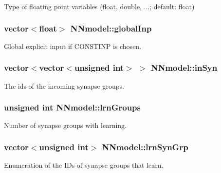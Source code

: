 Type of floating point variables (float, double, ...; default\+: float) 

\hypertarget{classNNmodel_a8df5fd36faa5a56edea7d287fea1f625}{
\subsubsection[{global\+Inp}]{\setlength{\rightskip}{0pt plus 5cm}vector$<$float$>$ N\+Nmodel\+::global\+Inp}}\label{classNNmodel_a8df5fd36faa5a56edea7d287fea1f625}


Global explicit input if C\+O\+N\+S\+T\+I\+N\+P is chosen. 

\hypertarget{classNNmodel_af3f5459e9438989b12e4b675352dd258}{
\subsubsection[{in\+Syn}]{\setlength{\rightskip}{0pt plus 5cm}vector$<$vector$<$unsigned int$>$ $>$ N\+Nmodel\+::in\+Syn}}\label{classNNmodel_af3f5459e9438989b12e4b675352dd258}


The ids of the incoming synapse groups. 

\hypertarget{classNNmodel_aa0e25f384103db3bcc8c8b0425ae01b3}{
\subsubsection[{lrn\+Groups}]{\setlength{\rightskip}{0pt plus 5cm}unsigned int N\+Nmodel\+::lrn\+Groups}}\label{classNNmodel_aa0e25f384103db3bcc8c8b0425ae01b3}


Number of synapse groups with learning. 

\hypertarget{classNNmodel_acbc44c117c06cf73ab36068eb701e240}{
\subsubsection[{lrn\+Syn\+Grp}]{\setlength{\rightskip}{0pt plus 5cm}vector$<$unsigned int$>$ N\+Nmodel\+::lrn\+Syn\+Grp}}\label{classNNmodel_acbc44c117c06cf73ab36068eb701e240}


Enumeration of the I\+Ds of synapse groups that learn. 

